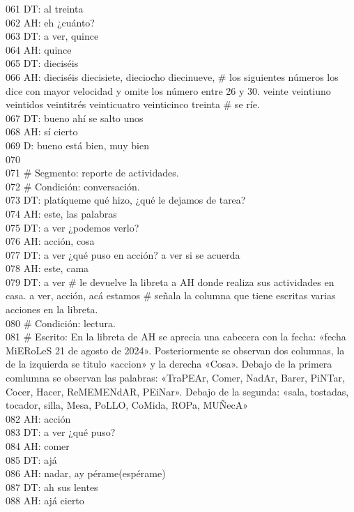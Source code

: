 061 DT: al treinta\\
062 AH: eh ¿cuánto?\\
063 DT: a ver, quince\\
064 AH: quince\\
065 DT: dieciséis\\
066 AH: dieciséis diecisiete, dieciocho diecinueve, \# los siguientes números los dice con mayor velocidad y omite los número entre 26 y 30. veinte veintiuno veintidos veintitrés veinticuatro veinticinco treinta \# se ríe.\\
067 DT: bueno ahí se salto unos\\
068 AH: sí cierto\\
069 D: bueno está bien, muy bien\\
070 \\
071 \# Segmento: reporte de actividades.\\
072 \# Condición: conversación.\\
073 DT: platíqueme qué hizo, ¿qué le dejamos de tarea?\\
074 AH: este, las palabras\\
075 DT: a ver ¿podemos verlo?\\
076 AH: acción, cosa\\
077 DT: a ver ¿qué puso en acción? a ver si se acuerda\\
078 AH: este, cama\\
079 DT: a ver \# le devuelve la libreta a AH donde realiza sus actividades en casa. a ver, acción, acá estamos \# señala la columna que tiene escritas varias acciones en la libreta.\\
080 \# Condición: lectura.\\
081 \# Escrito: En la libreta de AH se aprecia una cabecera con la fecha: «fecha MiERoLeS 21 de agosto de 2024». Posteriormente se observan dos columnas, la de la izquierda se titulo «accion» y la derecha «Cosa». Debajo de la primera comlumna se observan las palabras: «TraPEAr, Comer, NadAr, Barer, PiNTar, Cocer, Hacer, ReMEMENdAR, PEiNar». Debajo de la segunda: «sala, tostadas, tocador, silla, Mesa, PoLLO, CoMida, ROPa, MUÑecA»\\
082 AH: acción\\
083 DT: a ver ¿qué puso?\\
084 AH: comer\\
085 DT: ajá\\
086 AH: nadar, ay pérame(espérame)\\
087 DT: ah sus lentes\\
088 AH: ajá cierto\\
